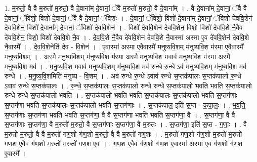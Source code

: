 \documentclass[17pt]{extarticle}
\begin{document}
1. म॒रुतो॒ वै वै म॒रुतो॑ म॒रुतो॒ वै दे॒वाना᳚म् दे॒वानां॒ ॅवै म॒रुतो॑ म॒रुतो॒ वै दे॒वाना᳚म् । . वै दे॒वाना᳚म् दे॒वानां॒ ॅवै वै दे॒वानां॒ ॅविशो॒ विशो॑ दे॒वानां॒ ॅवै वै दे॒वानां॒ ॅविशः॑ । . दे॒वानां॒ ॅविशो॒ विशो॑ दे॒वाना᳚म् दे॒वानां॒ ॅविशो॑ देववि॒शेन॑ देववि॒शेन॒ विशो॑ दे॒वाना᳚म् दे॒वानां॒ ॅविशो॑ देववि॒शेन॑ । . विशो॑ देववि॒शेन॑ देववि॒शेन॒ विशो॒ विशो॑ देववि॒शे नै॒वैव दे॑ववि॒शेन॒ विशो॒ विशो॑ देववि॒शे नै॒व । . दे॒व॒वि॒शे नै॒वैव दे॑ववि॒शेन॑ देववि॒शे नै॒वास्मा॑ अस्मा ए॒व दे॑ववि॒शेन॑ देववि॒शे नै॒वास्मै᳚ । . दे॒व॒वि॒शेनेति॑ देव - वि॒शेन॑ । . ए॒वास्मा॑ अस्मा ए॒वैवास्मै॑ मनुष्यवि॒शम् म॑नुष्यवि॒श म॑स्मा ए॒वैवास्मै॑ मनुष्यवि॒शम् । . अ॒स्मै॒ म॒नु॒ष्य॒वि॒शम् म॑नुष्यवि॒श म॑स्मा अस्मै मनुष्यवि॒श मवाव॑ मनुष्यवि॒श म॑स्मा अस्मै मनुष्यवि॒श मव॑ । . म॒नु॒ष्य॒वि॒श मवाव॑ मनुष्यवि॒शम् म॑नुष्यवि॒श मव॑ रुन्धे रु॒न्धे ऽव॑ मनुष्यवि॒शम् म॑नुष्यवि॒श मव॑ रुन्धे । . म॒नु॒ष्य॒वि॒शमिति॑ मनुष्य - वि॒शम् । . अव॑ रुन्धे रु॒न्धे ऽवाव॑ रुन्धे स॒प्तक॑पालः स॒प्तक॑पालो रु॒न्धे ऽवाव॑ रुन्धे स॒प्तक॑पालः । . रु॒न्धे॒ स॒प्तक॑पालः स॒प्तक॑पालो रुन्धे रुन्धे स॒प्तक॑पालो भवति भवति स॒प्तक॑पालो रुन्धे रुन्धे स॒प्तक॑पालो भवति । . स॒प्तक॑पालो भवति भवति स॒प्तक॑पालः स॒प्तक॑पालो भवति स॒प्तग॑णाः स॒प्तग॑णा भवति स॒प्तक॑पालः स॒प्तक॑पालो भवति स॒प्तग॑णाः । . स॒प्तक॑पाल॒ इति॑ स॒प्त - क॒पा॒लः॒ । . भ॒व॒ति॒ स॒प्तग॑णाः स॒प्तग॑णा भवति भवति स॒प्तग॑णा॒ वै वै स॒प्तग॑णा भवति भवति स॒प्तग॑णा॒ वै । . स॒प्तग॑णा॒ वै वै स॒प्तग॑णाः स॒प्तग॑णा॒ वै म॒रुतो॑ म॒रुतो॒ वै स॒प्तग॑णाः स॒प्तग॑णा॒ वै म॒रुतः । . स॒प्तग॑णा॒ इति॑ स॒प्त - ग॒णाः॒ । . वै म॒रुतो॑ म॒रुतो॒ वै वै म॒रुतो॑ गण॒शो ग॑ण॒शो म॒रुतो॒ वै वै म॒रुतो॑ गण॒शः । . म॒रुतो॑ गण॒शो ग॑ण॒शो म॒रुतो॑ म॒रुतो॑ गण॒श ए॒वैव ग॑ण॒शो म॒रुतो॑ म॒रुतो॑ गण॒श ए॒व । . ग॒ण॒श ए॒वैव ग॑ण॒शो ग॑ण॒श ए॒वास्मा॑ अस्मा ए॒व ग॑ण॒शो ग॑ण॒श ए॒वास्मै᳚ । \newline
\end{document}
